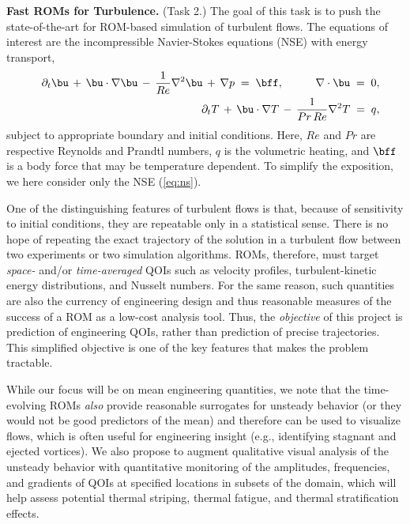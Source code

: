 \vspace{.08in}
\noindent \textbf{Fast ROMs for Turbulence.} (Task 2.)
The goal of this task is to push the state-of-the-art for ROM-based 
simulation of turbulent flows.
The equations of interest are the incompressible Navier-Stokes equations
(NSE) with energy transport,
\begin{eqnarray} \label{eq:ns}
&&
\partial_t \bu \,+\, \bu \cdot \nabla \bu \,-\, \frac{1}{Re} \nabla^2 \bu
\,+\, \nabla p \;=\; \bff, \hspace*{.4in} \nabla \cdot \bu \;=\; 0, 
\\ \label{eq:therm} 
&&
\partial_t T   \,+\, \bu \cdot \nabla T   \,-\, \frac{1}{Pr\,Re} \nabla^2 T
\;=\; q, 
\end{eqnarray}
subject to appropriate boundary and initial conditions. Here, $Re$ and $Pr$ are
respective Reynolds and Prandtl numbers, $q$ is the volumetric heating, and
$\bff$ is a body force that may be temperature dependent.
   To simplify the exposition, we here consider only the NSE (\ref{eq:ns}).

One of the distinguishing features of turbulent flows is that, because of
sensitivity to initial conditions, they are repeatable only in a statistical
sense.  There is no hope of repeating the exact trajectory of the solution in a
turbulent flow between two experiments or two simulation algorithms.  ROMs,
therefore, must target {\em space-} and/or {\em time-averaged} QOIs such as
velocity profiles,  turbulent-kinetic energy distributions, and Nusselt
numbers.  For the same reason, such quantities are also the currency of
engineering design and thus reasonable measures of the success of a ROM as a
low-cost analysis tool.  Thus, the {\em objective} of this project is
prediction of engineering QOIs, rather than prediction of precise 
trajectories.  This simplified objective is one of the key features that makes
the problem tractable.

    While our focus will be on mean engineering quantities, we note that the
time-evolving ROMs {\em also} provide reasonable surrogates for unsteady
behavior (or they would not be good predictors of the mean) and therefore can
be used to visualize flows, which is often useful for engineering insight
(e.g., identifying stagnant and ejected vortices).  We also propose to augment
qualitative visual analysis of the unsteady behavior with quantitative
monitoring of the amplitudes, frequencies, and gradients of QOIs at specified
locations in subsets of the domain, which will help assess potential
thermal striping, thermal fatigue, and thermal stratification effects.

